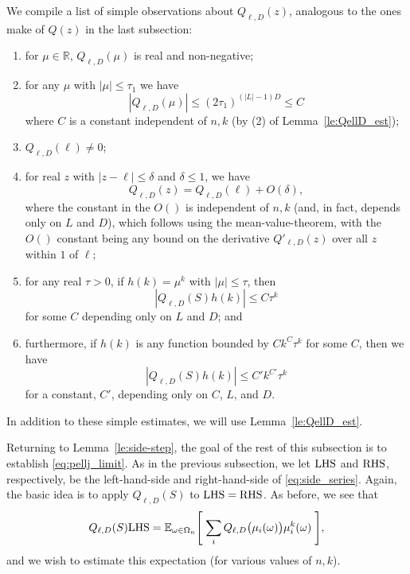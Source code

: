 \documentclass{memo-l}
\theoremstyle{plain}
\theoremstyle{definition}
\numberwithin{section}{chapter}
\numberwithin{equation}{chapter}
\newcommand{\expect}[2]{{\mathbb{E}}_{#1}{\left[\; #2\; \right]}}
\theoremstyle{plain}
\theoremstyle{definition}
\newcommand\RR{\mathbb{R}}
\begin{document}
We compile a list of simple observations about \( Q_{\ell,D}(z) \),
analogous to the ones make of \( Q(z) \) in the last subsection:
\begin{enumerate} \item for \( \mu\in\RR \), \( Q_{\ell,D}(\mu) \) is real
and non-negative; \item for any \( \mu \) with \( |\mu|\le\tau_1 \) we have
\begin{equation}\label{eq:allmu} |Q_{\ell,D}(\mu)| \leq
(2\tau_1)^{(|L|-1)D} \leq C \end{equation} where \( C \) is a constant
independent of \( n,k \) (by (2) of Lemma~\ref{le:QellD_est}); \item \(
Q_{\ell,D}(\ell)\ne 0 \); \item for real \( z \) with \( |z-\ell|\leq
\delta \) and \( \delta\leq 1 \), we have \begin{equation}\label{eq:Qderiv}
Q_{\ell,D}(z) = Q_{\ell,D}(\ell) +  O(\delta), \end{equation} where the
constant in the \( O() \) is independent of \( n,k \) (and, in fact,
depends only on \( L \) and \( D \)), which follows using the
mean-value-theorem, with the \( O() \) constant being any bound on the
derivative \( Q'_{\ell,D}(z) \) over all \( z \) within \( 1 \) of \( \ell
\); \item for any real \( \tau>0 \), if \( h(k)=\mu^k \) with \( |\mu|\leq
\tau \), then \[ |Q_{\ell,D}(S)h(k)| \leq C\tau^k \] for some \( C \)
depending only on \( L \) and \( D \); and \item furthermore, if \( h(k) \)
is any function bounded by \( Ck^C \tau^k \) for some \( C \), then we have
\[ |Q_{\ell,D}(S)h(k)| \leq C'k^{C'} \tau^k  \] for a constant, \( C' \),
depending only on \( C \), \( L \), and \( D \).  \end{enumerate} In
addition to these simple estimates, we will use Lemma~\ref{le:QellD_est}.

Returning to Lemma~\ref{le:side-step}, the goal of the rest of this subsection
is to establish \eqref{eq:pellj_limit}.  As in the previous subsection, we let
\( {\rm LHS} \) and \( {\rm RHS} \), respectively, be the left-hand-side
and right-hand-side of \eqref{eq:side_series}.  Again, the basic idea is to
apply \( Q_{\ell,D}(S) \) to \( {\rm LHS}={\rm RHS} \).  As before, we see
that \begin{equation}\label{eq:lhsD} Q_{\ell,D}(S){\rm LHS} =
\expect{\omega\in\Omega_n}{ \sum_i Q_{\ell,D}\bigl(\mu_i(\omega)\bigr)
\mu_i^k(\omega) }, \end{equation} and we wish to estimate this expectation
(for various values of \( n,k \)).
\end{document}
